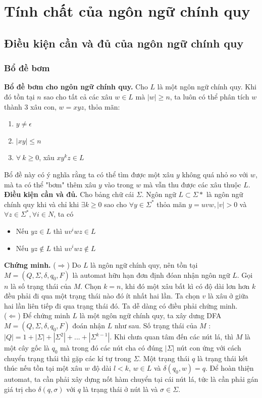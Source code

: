 \documentclass[14pt]{extreport}
\begin{document}
\chapter{Tính chất của ngôn ngữ chính quy}
\section{Điều kiện cần và đủ của ngôn ngữ chính quy}
\subsection{Bổ đề bơm}
\textbf{Bổ đề bơm cho ngôn ngữ chính quy.} Cho $L$ là một ngôn ngữ chính quy. Khi đó tồn tại $n$ sao cho tất cả các xâu $w \in L$ mà $|w| \geq n$, ta luôn có thể phân tích $w$ thành 3 xâu con, $w = xyz$, thỏa mãn:
\begin{enumerate}
\item $y \neq \epsilon$
\item $|xy| \leq n$
\item $\forall \ k \geq 0$, xâu $xy^kz \in L$
\end{enumerate}
Bổ đề này có ý nghĩa rằng ta có thể tìm được một xâu $y$ không quá nhỏ so với $w$, mà ta có thể "bơm" thêm xâu $y$ vào trong $w$ mà vẫn thu được các xâu thuộc $L$.\\
\textbf{Điều kiện cần và đủ.} Cho bảng chữ cái $\Sigma$. Ngôn ngữ $L \subset \Sigma*$ là ngôn ngữ chính quy khi và chỉ khi $\exists k \geq 0$ sao cho $\forall y \in \Sigma^*$ thỏa mãn $y = uvw, |v| > 0$ và $\forall z \in \Sigma^*, \forall i \in N$, ta có
\begin{itemize}
\item Nếu $yz \in L$ thì $uv^iwz \in L$
\item Nếu $yz \notin L$ thì $uv^iwz \notin L$
\end{itemize}
\textbf{Chứng minh.} ($\Rightarrow$) Do $L$ là ngôn ngữ chính quy, nên tồn tại $M = (Q, \Sigma, \delta, q_0, F)$ là automat hữu hạn đơn định đóan nhận ngôn ngữ $L$. Gọi $n$ là số trạng thái của $M$. Chọn $k = n$, khi đó một xâu bất kì có độ dài lơn hơn $k$ đều phải đi qua một trạng thái nào đó ít nhất hai lần. Ta chọn $v$ là xâu ở giữa hai lần liên tiếp đi qua trạng thái đó. Ta dễ dàng có điều phải chứng minh. \\

($\Leftarrow$) Để chứng minh $L$ là một ngôn ngữ chính quy, ta xây dưng DFA $M = (Q, \Sigma, \delta, q_0, F)$ đoán nhận $L$ như sau. Số trạng thái của $M$ :$|Q| = 1 + |\Sigma| + |\Sigma^2| + ... + |\Sigma^{k-1}|$. Khi chưa quan tâm đến các nút lá, thì $M$ là một cây gốc là $q_0$ mà trong đó các nút cha có đúng $|\Sigma|$ nút con ứng với cách chuyển trạng thái thì gặp các kí tự trong $\Sigma$. Một trạng thái $q$ là trạng thái kết thúc nếu tồn tại một xâu $w$ độ dài $l < k$, $w \in L$ và $\delta(q_0, w) = q$. Để hoàn thiện automat, ta cần phải xây dựng nốt hàm chuyển tại cái nút lá, tức là cần phải gán giá trị cho $\delta(q, \sigma)$ với $q$ là trạng thái ở nút là và $\sigma \in \Sigma$. \\
\end{document}
